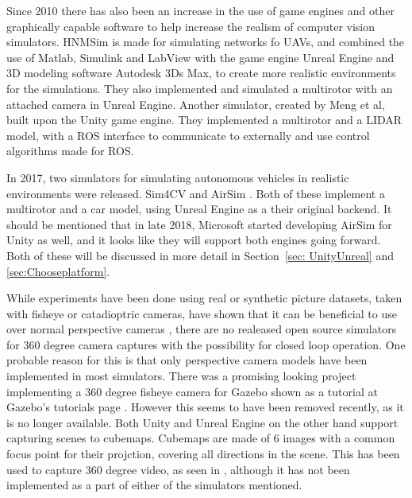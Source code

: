 Since 2010 there has also been an increase in the use of game engines and other graphically capable software to help increase the realism of computer vision simulators. HNMSim \cite{HNMSimPaper} is made for simulating networks fo UAVs, and combined the use of Matlab, Simulink and LabView with the game engine Unreal Engine and 3D modeling software Autodesk 3Ds Max, to create more realistic environments for the simulations. They also implemented and simulated a multirotor with an attached camera in Unreal Engine. Another simulator\cite{UnityROSsim}, created by Meng et al, built upon the Unity game engine. They implemented a multirotor and a LIDAR model, with a ROS interface to communicate to externally and use control algorithms made for ROS.

In 2017, two simulators for simulating autonomous vehicles in realistic environments were released. Sim4CV \cite{Sim4CV_paper} and AirSim \cite{Airsim_paper}. Both of these implement a multirotor and a car model, using Unreal Engine as a their original backend. It should be mentioned that in late 2018, Microsoft started developing AirSim for Unity as well, and it looks like they will support both engines going forward. Both of these will be discussed in more detail in Section~\ref{sec: UnityUnreal} and \ref{sec:Chooseplatform}.

While experiments have been done using real or synthetic picture datasets, taken with fisheye or catadioptric cameras, have shown that it can be beneficial to use over normal perspective cameras \cite{Zhang2016BenefitOL, OmniVIOKalman, CompOmniVSLAM}, there are no realeased open source simulators for 360 degree camera captures with the possibility for closed loop operation. One probable reason for this is that only perspective camera models have been implemented in most simulators. There was a promising looking project implementing a 360 degree fisheye camera for Gazebo shown as a tutorial at Gazebo's tutorials page \cite{GazeboWideWeb}. However this seems to have been removed recently, as it is no longer available. Both Unity and Unreal Engine on the other hand support capturing scenes to cubemaps. Cubemaps are made of 6 images with a common focus point for their projction, covering all directions in the scene. This has been used to capture 360 degree video, as seen in \cite{UnityCubeCapture, UnrealCubeCapture}, although it has not been implemented as a part of either of the simulators mentioned. 

